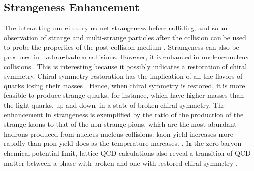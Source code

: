 \subsection{Strangeness Enhancement}
The interacting nuclei carry no net strangeness before colliding, and so an observation of strange and multi-strange particles after the collision can be used to probe the properties of the post-collision medium \cite{1742-6596-455-1-012005}. Strangeness can also be produced in hadron-hadron collisions. However, it is enhanced in nucleus-nucleus collisions \cite{Behera:2012eq}. This is interesting because it possibly indicates a restoration of chiral symmetry. Chiral symmetry restoration has the implication of all the flavors of quarks losing their masses \cite{Sazdjian:2016hrz}. Hence, when chiral symmetry is restored, it is more feasible to produce strange quarks, for instance, which have higher masses than the light quarks, up and down, in a state of broken chiral symmetry. The enhancement in strangeness is exemplified by the ratio of the production of the strange kaons to that of the non-strange pions, which are the most abundant hadrons produced from nucleus-nucleus collisions: kaon yield increases more rapidly than pion yield does as the temperature increases.%
 \cite{wong1994introduction}. In the zero baryon chemical potential limit, lattice QCD calculations also reveal a transition of QCD matter between a phase with broken and one with restored chiral symmetry \cite{ refId0}. %

